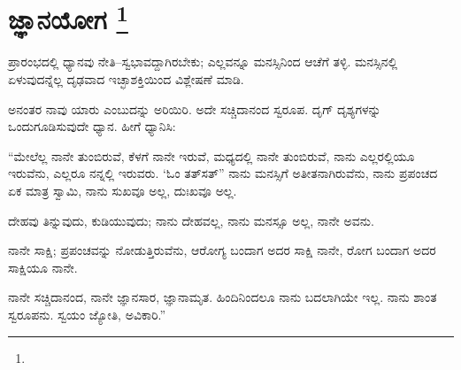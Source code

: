 
\chapter[ಜ್ಞಾನಯೋಗ ]{ಜ್ಞಾನಯೋಗ \protect\footnote{}}

ಪ್ರಾರಂಭದಲ್ಲಿ ಧ್ಯಾನವು ನೇತಿ–ಸ್ವಭಾವದ್ದಾಗಿರಬೇಕು; ಎಲ್ಲವನ್ನೂ ಮನಸ್ಸಿನಿಂದ ಆಚೆಗೆ ತಳ್ಳಿ. ಮನಸ್ಸಿನಲ್ಲಿ ಏಳುವುದನ್ನೆಲ್ಲ ದೃಢವಾದ ಇಚ್ಛಾಶಕ್ತಿಯಿಂದ ವಿಶ್ಲೇಷಣೆ ಮಾಡಿ.

ಅನಂತರ ನಾವು ಯಾರು ಎಂಬುದನ್ನು ಅರಿಯಿರಿ. ಅದೇ ಸಚ್ಚಿದಾನಂದ ಸ್ವರೂಪ. ದೃಗ್​ ದೃಶ್ಯಗಳನ್ನು ಒಂದುಗೂಡಿಸುವುದೇ ಧ್ಯಾನ. ಹೀಗೆ ಧ್ಯಾನಿಸಿ:

“ಮೇಲೆಲ್ಲ ನಾನೇ ತುಂಬಿರುವೆ, ಕೆಳಗೆ ನಾನೇ ಇರುವೆ, ಮಧ್ಯದಲ್ಲಿ ನಾನೇ ತುಂಬಿರುವೆ, ನಾನು ಎಲ್ಲರಲ್ಲಿಯೂ ಇರುವೆನು, ಎಲ್ಲರೂ ನನ್ನಲ್ಲಿ ಇರುವರು. ‘ಓಂ ತತ್​ಸತ್​” ನಾನು ಮನಸ್ಸಿಗೆ ಅತೀತನಾಗಿರುವೆನು, ನಾನು ಪ್ರಪಂಚದ ಏಕ ಮಾತ್ರ ಸ್ವಾಮಿ, ನಾನು ಸುಖವೂ ಅಲ್ಲ, ದುಃಖವೂ ಅಲ್ಲ.

ದೇಹವು ತಿನ್ನುವುದು, ಕುಡಿಯುವುದು; ನಾನು ದೇಹವಲ್ಲ, ನಾನು ಮನಸ್ಸೂ ಅಲ್ಲ, ನಾನೇ ಅವನು.

ನಾನೇ ಸಾಕ್ಷಿ; ಪ್ರಪಂಚವನ್ನು ನೋಡುತ್ತಿರುವೆನು, ಆರೋಗ್ಯ ಬಂದಾಗ ಅದರ ಸಾಕ್ಷಿ ನಾನೇ, ರೋಗ ಬಂದಾಗ ಅದರ ಸಾಕ್ಷಿಯೂ ನಾನೇ.

ನಾನೇ ಸಚ್ಚಿದಾನಂದ, ನಾನೇ ಜ್ಞಾನಸಾರ, ಜ್ಞಾನಾಮೃತ. ಹಿಂದಿನಿಂದಲೂ ನಾನು ಬದಲಾಗಿಯೇ ಇಲ್ಲ. ನಾನು ಶಾಂತ ಸ್ವರೂಪನು. ಸ್ವಯಂ ಜ್ಯೋತಿ, ಅವಿಕಾರಿ.”

